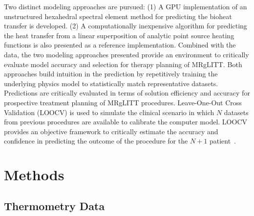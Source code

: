 \documentclass[12pt]{article}
\begin{document}
Two distinct modeling approaches are pursued: 
(1) A GPU implementation of an unstructured hexahedral spectral element method
for predicting the bioheat transfer is developed. 
(2) A computationally inexpensive algorithm for predicting the heat transfer
from a linear superposition of analytic point source heating functions is also
presented as a reference implementation.
{\color{red}
Combined with the data, the two modeling approaches presented provide an
environment to critically evaluate model accuracy and  selection for therapy
planning of MRgLITT. 
}
Both approaches 
build intuition in the prediction by
repetitively training the underlying physics model 
to statistically match representative datasets. 
Predictions are critically evaluated in terms of solution efficiency and
accuracy for prospective treatment planning of MRgLITT procedures. 
Leave-One-Out Cross Validation (LOOCV) is used to simulate the clinical
scenario in which $N$ datasets from previous procedures are available to
calibrate the computer model. LOOCV provides an objective framework to
critically estimate the accuracy and confidence in predicting the outcome
of the procedure for the $N+1$ patient~\cite{Stone1974,Geisser1975,Kohavi1995,Browne2000,Arlot2010}.

\section{Methods }
\subsection{Thermometry Data }\label{ThermometryData}
\end{document}
